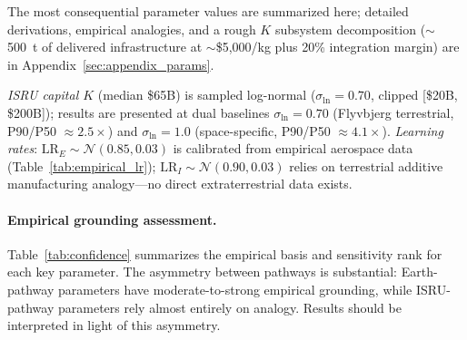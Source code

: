 \documentclass[5p,twocolumn]{elsarticle}
\begin{document}
The most consequential parameter values are summarized here; detailed derivations, empirical analogies, and a rough $K$ subsystem decomposition (${\sim}$500~t of delivered infrastructure at ${\sim}$\$5{,}000/kg plus 20\% integration margin) are in Appendix~\ref{sec:appendix_params}.

\emph{ISRU capital $K$} (median \$65B) is sampled log-normal ($\sigma_{\ln} = 0.70$, clipped [\$20B, \$200B]); results are presented at dual baselines $\sigma_{\ln} = 0.70$ (Flyvbjerg terrestrial, P90/P50 $\approx 2.5\times$) and $\sigma_{\ln} = 1.0$ (space-specific, P90/P50 $\approx 4.1\times$). \emph{Learning rates}: $\mathrm{LR}_E \sim \mathcal{N}(0.85, 0.03)$ is calibrated from empirical aerospace data (Table~\ref{tab:empirical_lr}); $\mathrm{LR}_I \sim \mathcal{N}(0.90, 0.03)$ relies on terrestrial additive manufacturing analogy---no direct extraterrestrial data exists.

\paragraph{Empirical grounding assessment.} Table~\ref{tab:confidence} summarizes the empirical basis and sensitivity rank for each key parameter. The asymmetry between pathways is substantial: Earth-pathway parameters have moderate-to-strong empirical grounding, while ISRU-pathway parameters rely almost entirely on analogy. Results should be interpreted in light of this asymmetry.

\begin{table}[htbp]
\centering
\caption{Parameter confidence assessment. Grounding: S=strong (direct empirical), M=moderate (cross-domain analogy), W=weak (order-of-magnitude estimate), N=none (pure assumption). Sensitivity from PRCC (Table~\ref{tab:spearman}).}
\label{tab:confidence}
\small
{}
\end{table}
\end{document}
